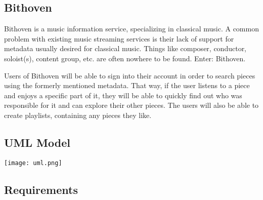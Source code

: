 
\subsection{Bithoven}
\label{project-description-bithoven}
Bithoven is a music information service, specializing in classical music. A
common problem with existing music streaming services is their lack of support
for metadata usually desired for classical music. Things like composer,
conductor, soloist(s), content group, etc. are often nowhere to be found.
Enter: Bithoven.

Users of Bithoven will be able to sign into their account in order to search
pieces using the formerly mentioned metadata. That way, if the user listens to
a piece and enjoys a specific part of it, they will be able to quickly find out
who was responsible for it and can explore their other pieces. The users will
also be able to create playlists, containing any pieces they like.

\subsection{UML Model}
\label{project-description-uml}
\texttt{[image: uml.png]}

\subsection{Requirements}
\label{project-description-req}

